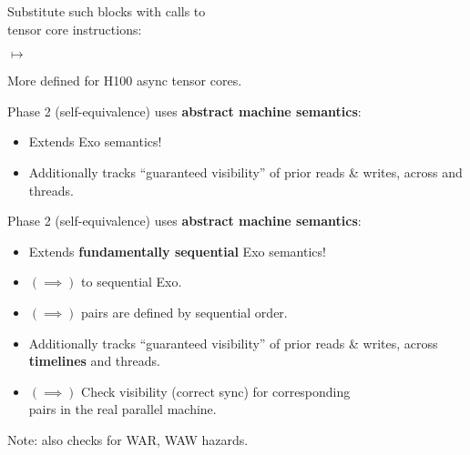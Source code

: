 \newpage
{}

{\LARGE
Substitute such blocks with calls to\\
 tensor core instructions:

}

{\LARGE

}

\vspace{8mm}

{\LARGE
$\mapsto$ 
}

\vspace{8mm}

{\LARGE
More  defined for H100 async tensor cores.

}


\newpage
{}

{\LARGE
Phase 2 (self-equivalence) uses \textbf{abstract machine semantics}:
\begin{itemize}
  \item Extends  Exo semantics!
  \item Additionally tracks ``guaranteed visibility'' of prior reads \& writes, across  and threads.
\end{itemize}

}

\begin{center}
{\large
{}
}
\end{center}


\newpage
{}

{\LARGE
Phase 2 (self-equivalence) uses \textbf{abstract machine semantics}:
\begin{itemize}
  \item {\color{lightgray} Extends \textbf{fundamentally sequential} Exo semantics!}
  \item $(\implies)$  to sequential Exo.
  \item $(\implies)$  pairs are defined by sequential order.
  \item {\color{lightgray} Additionally tracks ``guaranteed visibility'' of prior reads \& writes, across \textbf{timelines} and threads.}
  \item $(\implies)$ Check visibility (correct sync) for corresponding\\ pairs in the real parallel machine.
\end{itemize}

\vfill

\hfill Note: also checks for WAR, WAW hazards.

}


